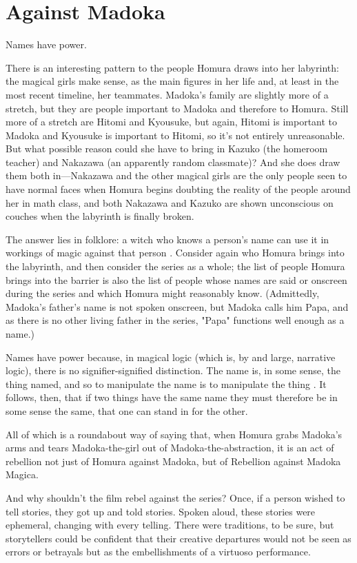 \chapter{Against Madoka}
Names have power. 

There is an interesting pattern to the people Homura draws into her labyrinth: the magical girls make sense, as the main figures in her life and, at least in the most recent timeline, her teammates. Madoka's family are slightly more of a stretch, but they are people important to Madoka and therefore to Homura. Still more of a stretch are Hitomi and Kyousuke, but again, Hitomi is important to Madoka and Kyousuke is important to Hitomi, so it's not entirely unreasonable. But what possible reason could she have to bring in Kazuko (the homeroom teacher) and Nakazawa (an apparently random classmate)? And she does draw them both in—Nakazawa and the other magical girls are the only people seen to have normal faces when Homura begins doubting the reality of the people around her in math class, and both Nakazawa and Kazuko are shown unconscious on couches when the labyrinth is finally broken.

The answer lies in folklore: a witch who knows a person's name can use it in workings of magic against that person \cite{ref120}. Consider again who Homura brings into the labyrinth, and then consider the series as a whole; the list of people Homura brings into the barrier is also the list of people whose names are said or onscreen during the series and which Homura might reasonably know. (Admittedly, Madoka's father's name is not spoken onscreen, but Madoka calls him Papa, and as there is no other living father in the series, "Papa" functions well enough as a name.) 

Names have power because, in magical logic (which is, by and large, narrative logic), there is no signifier-signified distinction. The name is, in some sense, the thing named, and so to manipulate the name is to manipulate the thing \cite{ref121}. It follows, then, that if two things have the same name they must therefore be in some sense the same, that one can stand in for the other.

All of which is a roundabout way of saying that, when Homura grabs Madoka's arms and tears Madoka-the-girl out of Madoka-the-abstraction, it is an act of rebellion not just of Homura against Madoka, but of Rebellion against Madoka Magica.

And why shouldn't the film rebel against the series? Once, if a person wished to tell stories, they got up and told stories. Spoken aloud, these stories were ephemeral, changing with every telling. There were traditions, to be sure, but storytellers could be confident that their creative departures would not be seen as errors or betrayals but as the embellishments of a virtuoso performance.

